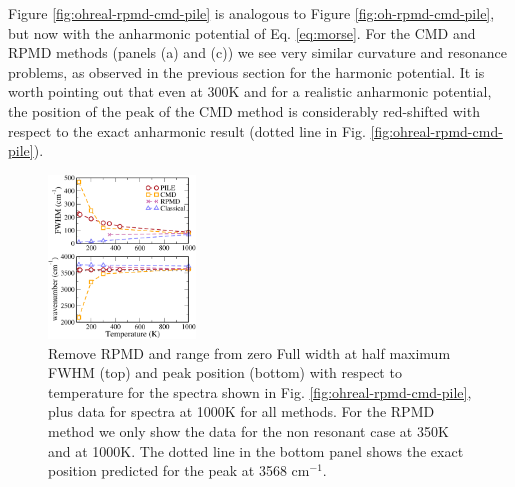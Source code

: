 \documentclass[aps,prb,superscriptaddress,amsmath,amssymb,showpacs,twocolumn]{revtex4}
\begin{document}
Figure \ref{fig:ohreal-rpmd-cmd-pile} is analogous to Figure \ref{fig:oh-rpmd-cmd-pile}, 
but now with the anharmonic potential of Eq. \ref{eq:morse}. 
For the CMD and RPMD methods (panels (a) and (c)) we
see very similar curvature and resonance problems, as observed in the 
previous section for the harmonic potential. 
It is worth pointing out that even at 300K and for a realistic anharmonic potential, 
the position of the peak of the CMD method is considerably red-shifted with respect 
to the exact anharmonic result (dotted line in Fig. \ref{fig:ohreal-rpmd-cmd-pile}). 

\begin{figure}[htbp]
\centering
\includegraphics[width=0.35\textwidth]{figures/ohreal_positionbroad.pdf}
\caption{{\color{red} Remove RPMD and range from zero} Full width at half maximum FWHM (top) and peak position (bottom) with respect 
to temperature for the spectra shown in Fig. \ref{fig:ohreal-rpmd-cmd-pile}, 
plus data for spectra at 1000K for all methods. For the RPMD method we only 
show the data for the non resonant case at 350K and at 1000K. The dotted line 
in the bottom panel shows the exact position predicted for the peak at 3568 cm$^{-1}$.}
\label{fig:ohreal-position-broad}
\end{figure}
\end{document}

